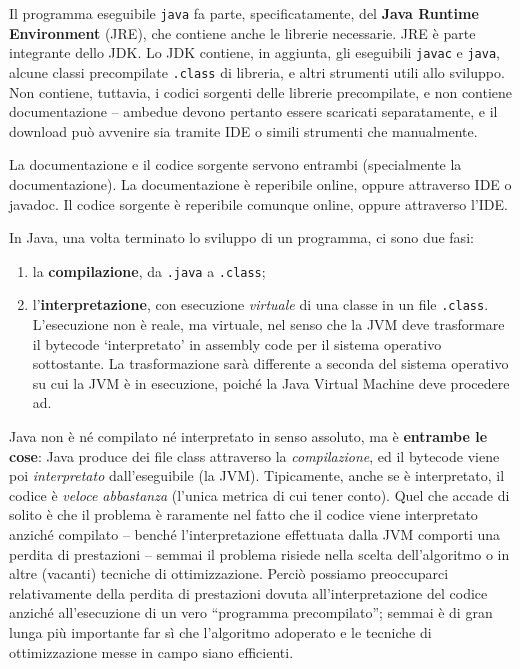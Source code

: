 \documentclass[\fontsizeclass,twocolumn]{\classname}
\let\oldtextsc\textsc
\renewcommand{\textsc}[1]{\oldtextsc{\scfontfs #1}}
\theoremstyle{definition}
\theoremstyle{definition}
\begin{document}
Il programma eseguibile \texttt{java} fa parte, specificatamente, del
\textbf{Java Runtime Environment} (JRE), che contiene anche le librerie
necessarie. JRE è parte integrante dello JDK. Lo JDK contiene, in aggiunta, gli
eseguibili \texttt{javac} e \texttt{java}, alcune classi precompilate
\texttt{.class} di libreria, e altri strumenti utili allo sviluppo. Non
contiene, tuttavia, i codici sorgenti delle librerie precompilate, e non
contiene documentazione \--- ambedue devono pertanto essere scaricati
separatamente, e il download può avvenire sia tramite \textsc{IDE} o simili strumenti
che manualmente.

La documentazione e il codice sorgente servono entrambi (specialmente la
documentazione). La documentazione è reperibile online, oppure attraverso \textsc{IDE} o
javadoc. Il codice sorgente è reperibile comunque online, oppure attraverso
l'\textsc{IDE}.

In Java, una volta terminato lo sviluppo di un programma, ci sono due fasi:
\begin{enumerate}
	\item la \textbf{compilazione}, da \texttt{.java} a \texttt{.class};
	\item l'\textbf{interpretazione}, con esecuzione \emph{virtuale} di una
		classe in un file \texttt{.class}. L'esecuzione non è reale, ma
		virtuale, nel senso che la JVM deve trasformare il bytecode
		`interpretato' in assembly code per il sistema operativo sottostante. La
		trasformazione sarà differente a seconda del sistema operativo su cui la
		JVM è in esecuzione, poiché la Java Virtual Machine deve procedere ad.
\end{enumerate}

Java non è né compilato né interpretato in senso assoluto, ma è
\textbf{entrambe le cose}: Java produce dei file class attraverso la
\emph{compilazione}, ed il bytecode viene poi \emph{interpretato}
dall'eseguibile (la JVM). Tipicamente, anche se è interpretato, il codice è
\emph{veloce abbastanza} (l'unica metrica di cui tener conto). Quel che accade
di solito è che il problema è raramente nel fatto che il codice viene
interpretato anziché compilato -- benché l'interpretazione effettuata dalla JVM
comporti una perdita di prestazioni -- semmai il problema risiede nella scelta
dell'algoritmo o in altre (vacanti) tecniche di ottimizzazione. Perciò possiamo
preoccuparci relativamente della perdita di prestazioni dovuta
all'interpretazione del codice anziché all'esecuzione di un vero ``programma
precompilato''; semmai è di gran lunga più importante far sì che l'algoritmo
adoperato e le tecniche di ottimizzazione messe in campo siano efficienti.
\end{document}
